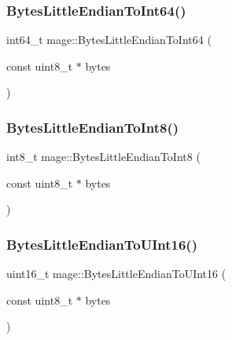 \hypertarget{namespacemage_ae242f13f851ffa9c73bdcb17902f6b57}{}\label{namespacemage_ae242f13f851ffa9c73bdcb17902f6b57} 
\subsubsection{\texorpdfstring{Bytes\+Little\+Endian\+To\+Int64()}{BytesLittleEndianToInt64()}}
{\footnotesize\ttfamily int64\+\_\+t mage\+::\+Bytes\+Little\+Endian\+To\+Int64 (\begin{DoxyParamCaption}\item[{const uint8\+\_\+t $\ast$}]{bytes }\end{DoxyParamCaption})}

\hypertarget{namespacemage_a083a2ea889a770925db23c1f514454d9}{}\label{namespacemage_a083a2ea889a770925db23c1f514454d9} 
\subsubsection{\texorpdfstring{Bytes\+Little\+Endian\+To\+Int8()}{BytesLittleEndianToInt8()}}
{\footnotesize\ttfamily int8\+\_\+t mage\+::\+Bytes\+Little\+Endian\+To\+Int8 (\begin{DoxyParamCaption}\item[{const uint8\+\_\+t $\ast$}]{bytes }\end{DoxyParamCaption})}

\hypertarget{namespacemage_aca75f80f9445dd764414522db4967336}{}\label{namespacemage_aca75f80f9445dd764414522db4967336} 
\subsubsection{\texorpdfstring{Bytes\+Little\+Endian\+To\+U\+Int16()}{BytesLittleEndianToUInt16()}}
{\footnotesize\ttfamily uint16\+\_\+t mage\+::\+Bytes\+Little\+Endian\+To\+U\+Int16 (\begin{DoxyParamCaption}\item[{const uint8\+\_\+t $\ast$}]{bytes }\end{DoxyParamCaption})}

